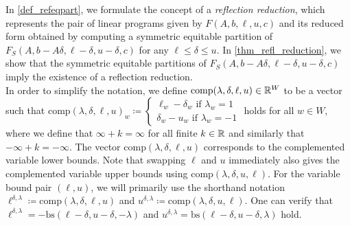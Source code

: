 \documentclass[pdflatex,sn-mathphys-num]{sn-jnl}%
\theoremstyle{thmstyleone}%
\theoremstyle{thmstylethree}%
\theoremstyle{thmstyletwo}%
\begin{document}
In \cref{def_refeqpart}, we formulate the concept of a \emph{reflection reduction}, which represents the pair of linear programs given by $F(A,b,\ell,u,c)$ and its reduced form obtained by computing a symmetric equitable partition of $F_S(A,b-A\delta, \ell - \delta, u - \delta,c)$ for any $\ell \leq \delta \leq u$. In \cref{thm_refl_reduction}, we show that the symmetric equitable partitions of $F_S(A,b-A\delta, \ell - \delta, u - \delta,c)$ imply the existence of a reflection reduction.\\

In order to simplify the notation,  we
define $\mathrm{comp}(\lambda, \delta, \ell,u)\in \mathbb{R}^W$ to be a vector such that $\mathrm{comp}(\lambda, \delta, \ell,u)_w \coloneqq \begin{cases} 
\ell_w - \delta_w \text{ if } \lambda_w = 1\\
\delta_w - u_w \text{ if } \lambda_w = -1
\end{cases}$ holds for all $w\in W$, where we define that $\infty + k = \infty $ for all finite $k\in \mathbb{R}$ and similarly that $-\infty + k = -\infty$. The vector $\mathrm{comp}(\lambda, \delta, \ell,u)$ corresponds to the complemented variable lower bounds. Note that swapping $\ell$ and $u$ immediately also gives the complemented variable upper bounds using $\mathrm{comp}(\lambda, \delta, u, \ell)$.
 For the variable bound pair $(\ell,u)$, we will primarily use the shorthand notation $\ell^{\delta,\lambda} \coloneqq \mathrm{comp}(\lambda, \delta, \ell, u)$ and $u^{\delta,\lambda} \coloneqq \mathrm{comp}(\lambda, \delta, u, \ell)$. One can verify that $\ell^{\delta,\lambda} = -\mathrm{bs}(\ell-\delta,u-\delta,-\lambda)$ and $u^{\delta,\lambda} = \mathrm{bs}(\ell-\delta,u-\delta,\lambda)$ hold.
\end{document}
